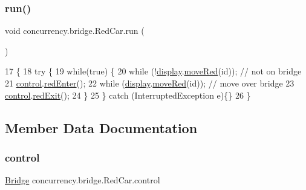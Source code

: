\subsubsection{\texorpdfstring{run()}{run()}}
{\footnotesize\ttfamily void concurrency.\+bridge.\+Red\+Car.\+run (\begin{DoxyParamCaption}{ }\end{DoxyParamCaption})\hspace{0.3cm}{\ttfamily [inline]}}


\begin{DoxyCode}
17                       \{
18       \textcolor{keywordflow}{try} \{
19         \textcolor{keywordflow}{while}(\textcolor{keyword}{true}) \{
20             \textcolor{keywordflow}{while} (!\mbox{\hyperlink{classconcurrency_1_1bridge_1_1_red_car_a74921d6c4626acedf0c000703a4c138b}{display}}.\mbox{\hyperlink{classconcurrency_1_1bridge_1_1_bridge_canvas_a166d001c782d362f3a8aca27e493a074}{moveRed}}(\textcolor{keywordtype}{id}));  \textcolor{comment}{// not on bridge}
21             \mbox{\hyperlink{classconcurrency_1_1bridge_1_1_red_car_a8f1e50b1058d7f3a2215c064435655e5}{control}}.\mbox{\hyperlink{classconcurrency_1_1bridge_1_1_bridge_a7982b9ef7be674502b81fa044e641fac}{redEnter}}();
22             \textcolor{keywordflow}{while} (\mbox{\hyperlink{classconcurrency_1_1bridge_1_1_red_car_a74921d6c4626acedf0c000703a4c138b}{display}}.\mbox{\hyperlink{classconcurrency_1_1bridge_1_1_bridge_canvas_a166d001c782d362f3a8aca27e493a074}{moveRed}}(\textcolor{keywordtype}{id}));   \textcolor{comment}{// move over bridge}
23             \mbox{\hyperlink{classconcurrency_1_1bridge_1_1_red_car_a8f1e50b1058d7f3a2215c064435655e5}{control}}.\mbox{\hyperlink{classconcurrency_1_1bridge_1_1_bridge_a0a06653bf84948f239379486b85e32f9}{redExit}}();
24         \}
25       \} \textcolor{keywordflow}{catch} (InterruptedException e)\{\}
26     \}
\end{DoxyCode}


\subsection{Member Data Documentation}
\mbox{\label{classconcurrency_1_1bridge_1_1_red_car_a8f1e50b1058d7f3a2215c064435655e5}} 
\subsubsection{\texorpdfstring{control}{control}}
{\footnotesize\ttfamily \mbox{\hyperlink{classconcurrency_1_1bridge_1_1_bridge}{Bridge}} concurrency.\+bridge.\+Red\+Car.\+control\hspace{0.3cm}{\ttfamily [package]}}

